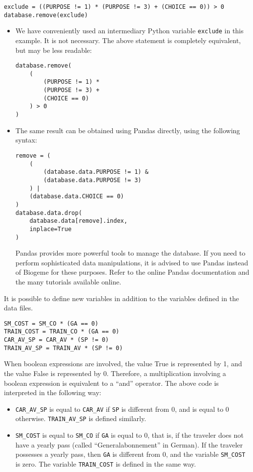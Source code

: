 \documentclass[12pt,a4paper]{article}
\begin{document}
\begin{lstlisting}[style=nonumbers]
exclude = ((PURPOSE != 1) * (PURPOSE != 3) + (CHOICE == 0)) > 0
database.remove(exclude)
\end{lstlisting}

\begin{itemize}
\item We have conveniently used an intermediary Python variable
\lstinline+exclude+ in this example. It is not necessary. The above
statement is completely equivalent, but may be less readable:
\begin{lstlisting}[style=nonumbers]
database.remove(
    (
        (PURPOSE != 1) *
        (PURPOSE != 3) +
        (CHOICE == 0)
    ) > 0
)
\end{lstlisting}
\item The same result can be obtained using Pandas
directly, using the following syntax:
\begin{lstlisting}[style=nonumbers]
remove = (
    (
        (database.data.PURPOSE != 1) &
        (database.data.PURPOSE != 3)
    ) |
    (database.data.CHOICE == 0)
)
database.data.drop(
    database.data[remove].index,
    inplace=True
)
\end{lstlisting}
Pandas provides more powerful tools to manage the database. If you
need to perform sophisticated data manipulations, it is advised to use
Pandas instead of Biogeme for these purposes. Refer to the online
Pandas documentation and the many tutorials available online. 
\end{itemize}


It is possible to define new variables in addition to the variables
defined in the data files. 
\begin{lstlisting}[style=nonumbers]
SM_COST = SM_CO * (GA == 0)
TRAIN_COST = TRAIN_CO * (GA == 0)
CAR_AV_SP = CAR_AV * (SP != 0)
TRAIN_AV_SP = TRAIN_AV * (SP != 0)
\end{lstlisting}

When boolean expressions are involved, the value True is
  represented by 1, and the value False is represented by
  0. Therefore, a multiplication involving a boolean expression is
  equivalent to a ``and'' operator. The above code is interpreted in
  the following way:
\begin{itemize}
\item \lstinline$CAR_AV_SP$ is equal to \lstinline$CAR_AV$ if
  \lstinline$SP$ is different from 0, and is equal to 0
  otherwise. \lstinline$TRAIN_AV_SP$ is defined similarly.
\item \lstinline$SM_COST$ is equal to \lstinline$SM_CO$ if
  \lstinline$GA$ is equal to 0, that is, if the traveler does not have
  a yearly pass (called ``Generalabonnement'' in German). If the traveler
  possesses a yearly pass, then \lstinline$GA$ is different from 0,
  and the variable \lstinline$SM_COST$ is zero. The variable
  \lstinline$TRAIN_COST$ is defined in the same way.
\end{itemize}
\end{document}
